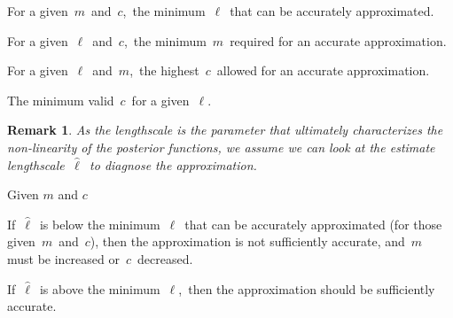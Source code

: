 \documentclass[landscape,a1,final]{a0poster} %
\newtheorem*{remark}{Remark}
\let\tempone\itemize
\let\temptwo\enditemize
\renewenvironment{itemize}{\tempone\addtolength{\itemsep}{-0.3\baselineskip}}{\temptwo}
\begin{document}
\begin{minipage}{1\linewidth}
\begin{minipage}[t]{0.345\textwidth}
\begin{minipage}{0.67\textwidth}
\vspace{-1.5cm}
\centering
\begin{tcolorbox}[colframe=blue!20, colback=white, title={\small \color{black!80} This model of relationships says...}, colbacktitle=lightblue, coltitle=black, boxrule=0.5pt, width=0.975\textwidth]
\begin{itemize}\setlength\itemsep{1mm}
\item For a given\, $m$\, and\, $c$,\, the minimum\, $\ell$\, that can be accurately approximated.
\item For a given\, $\ell$\, and\, $c$,\, the minimum\, $m$\, required for an accurate approximation.
\item For a given\, $\ell$\, and\, $m$,\, the highest\, $c$\, allowed for an accurate approximation.
\item The minimum valid\, $c$\, for a given\, $\ell$.
\end{itemize}
\end{tcolorbox}
\end{minipage}

\vspace{-3mm}
{\centering
\begin{tcolorbox}[colframe=blue!20, colback=white, title={\small \color{black!80} This model of relationships serves as a\, \textsc{\textbf{\color{black} \normalsize diagnosis tool}}\, of the approximation:}, colbacktitle=lightblue, coltitle=black, boxrule=0.5pt, width=0.98\textwidth]
\begin{remark}
As the lengthscale is the parameter that ultimately characterizes the non-linearity of the posterior functions, we assume we can look at the {\color{navyblue} estimate lengthscale}\, $\hat{\ell}$\, to diagnose the approximation.
\end{remark}

\begin{itemize}\setlength\itemsep{1mm}
\item Given $m$ and $c$

\item If\, $\hat{\ell}$\, {\color{navyblue} is below} the minimum\, $\ell$\, that can be accurately approximated (for those given\, $m$\, and\, $c$), then the approximation {\color{navyblue} is not sufficiently accurate}, and\, $m$\, must be increased or\, $c$\, decreased.

\item If\, $\hat{\ell}$\, {\color{navyblue} is above} the minimum\, $\ell$,\, then the approximation should be {\color{navyblue} sufficiently accurate}.


\end{itemize}
\end{tcolorbox}}
\end{minipage}
\end{minipage}
\end{document}
